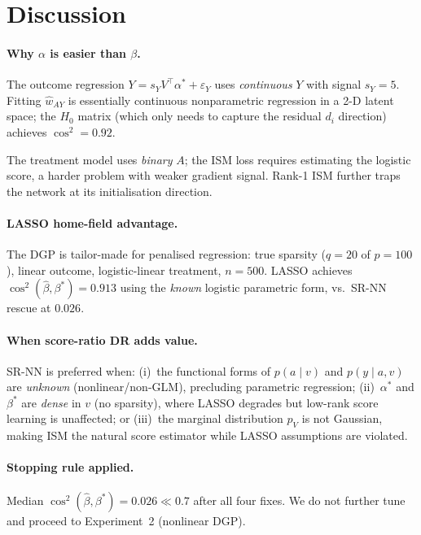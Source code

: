\documentclass[11pt]{article}
\newcommand{\hatbeta}{\hat\beta}
\begin{document}
\section{Discussion}
\label{sec:discussion}

\paragraph{Why $\alpha$ is easier than $\beta$.}
The outcome regression $Y = s_Y V^\top\alpha^* + \varepsilon_Y$ uses
\emph{continuous} $Y$ with signal $s_Y=5$.  Fitting $\hat w_{AY}$ is essentially
continuous nonparametric regression in a 2-D latent space; the $H_0$ matrix (which
only needs to capture the residual $d_i$ direction) achieves $\cos^2=0.92$.

The treatment model uses \emph{binary} $A$; the ISM loss requires estimating
the logistic score, a harder problem with weaker gradient signal.
Rank-1 ISM further traps the network at its initialisation direction.

\paragraph{LASSO home-field advantage.}
The DGP is tailor-made for penalised regression:
true sparsity ($q=20$ of $p=100$), linear outcome, logistic-linear treatment,
$n=500$.  LASSO achieves $\cos^2(\hatbeta,\beta^*)=0.913$ using the \emph{known}
logistic parametric form, vs.\ SR-NN rescue at $0.026$.

\paragraph{When score-ratio DR adds value.}
SR-NN is preferred when:
(i)~the functional forms of $p(a\mid v)$ and $p(y\mid a,v)$ are \emph{unknown}
(nonlinear/non-GLM), precluding parametric regression;
(ii)~$\alpha^*$ and $\beta^*$ are \emph{dense} in $v$ (no sparsity), where LASSO
degrades but low-rank score learning is unaffected; or
(iii)~the marginal distribution $p_V$ is not Gaussian, making ISM the natural
score estimator while LASSO assumptions are violated.

\paragraph{Stopping rule applied.}
Median $\cos^2(\hat\beta,\beta^*)=0.026\ll0.7$ after all four fixes.
We do not further tune and proceed to Experiment~2 (nonlinear DGP).
\end{document}
